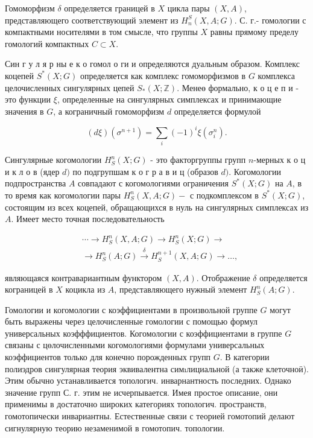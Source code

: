 \documentclass[10pt]{article}
\begin{document}
Гомоморфизм $\delta$ определяется границей в $X$ цикла пары $(X, A)$, представляющего соответствующий элемент из $H_{n}^{S}(X, A ; G)$. С. г.- гомологии с компактными носителями в том смысле, что группы $X$ равны прямому пределу гомологий компактных $C \subset X$.



Син г у л я р ны е к о гомол о ги и определяются дуальным образом. Комплекс коцепей $S^{*}(X ; G)$ определяется как комплекс гомоморфизмов в $G$ комплекса целочисленных сингулярных цепей $S_{*}(X ; \mathbb{Z})$. Менеө формально, к о ц е п и - это функции $\xi$, определенные на сингулярных симплексах и принимающие значения в $G$, а кограничный гомоморфизм $d$ определяется формулой



\[

(d \xi)\left(\sigma^{n+1}\right)=\sum_{i}(-1)^{i} \xi\left(\sigma_{i}^{n}\right) .

\]



Сингулярные когомологии $H_{S}^{n}(X ; G)$ - это факторгруппы групп $n$-мерных к о ц и к л о в (ядер $d)$ по подгрупшам к о г р а в и ц (образов $d)$. Когомологии подпространства $A$ совпадают с когомологиями ограничения $S^{*}(X ; G)$ на $A$, в то время как когомологии пары $H_{S}^{n}(X, A ; G)-$ с подкомплексом в $S^{*}(X ; G)$, состоящим из всех коцепей, обращающихся в нуль на сингулярных симплексах из $A$. Имеет место точная последовательность



\[

\begin{aligned}

& \cdots \longrightarrow H_{S}^{n}(X, A ; G) \longrightarrow H_{S}^{n}(X ; G) \longrightarrow \\

& \longrightarrow H_{S}^{n}(A ; G) \stackrel{\delta}{\longrightarrow} H_{S}^{n+1}(X, A ; G) \longrightarrow \ldots,

\end{aligned}

\]



являющаяся контравариантным функтором $(X, A)$. Отображение $\delta$ определяется кограницей в $X$ коцикла из $A$, представляющего нужный элемент $H_{S}^{n}(A ; G)$.



Гомологии и когомологии с коэффициентами в произвольной группе $G$ могут быть выражены через целочисленные гомологии с помощью формул универсальных коэфффициентов. Когомологии с коэффициентами в группе $G$ связаны с цөлочисленными когомологиями формулами универсальных коэффициентов только для конечно порожденных групп $G$. В категории полиэдров сингулярная теория эквивалентна симıлициальной (а также клеточноӥ). Этим обычно устанавливается топологич. инварнантность последних. Однако значение групп С. г. этим не исчерпывается. Имея простое описание, они применимы в достаточно широких категориях топологич. пространств, гомотопически инвариантны. Естественные связи с теорией гомотопий делают сигнулярную теорию незаменимой в гомотопич. топологии.
\end{document}

